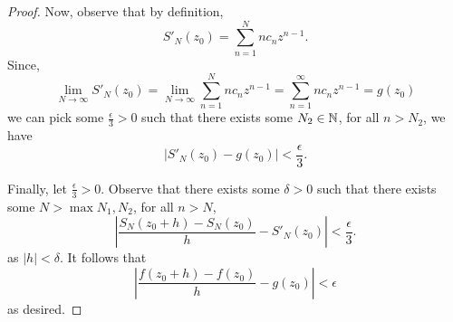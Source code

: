 \documentclass[11pt]{article}
\begin{document}
\begin{proof}
Now, observe that by definition,
\begin{equation*}
S'_N(z_0) = \sum^N_{n=1} nc_nz^{n-1}.
\end{equation*}
Since,
\begin{equation*}
\lim_{N\to\infty} S'_N(z_0)
= \lim_{N\to\infty} \sum^N_{n=1} nc_nz^{n-1}
= \sum^\infty_{n=1} nc_nz^{n-1}
= g(z_0)
\end{equation*}
we can pick some $\frac{\epsilon}{3} >0$ such that there exists some $N_2\in\mathbb{N}$,
for all $n > N_2$, we have
\begin{equation*}
|S'_N(z_0) - g(z_0)| < \frac{\epsilon}{3}.
\end{equation*}

Finally, let $\frac{\epsilon}{3} > 0$. Observe that there exists some $\delta >
0$ such that there exists some $N > \max{N_1,N_2}$, for all $n > N$,
\begin{equation*}
\left|\frac{S_N(z_0+h) - S_N(z_0)}{h} - S'_N(z_0)\right| <
\frac{\epsilon}{3}.
\end{equation*}
as $|h| < \delta$. It follows that
\begin{equation*}
\left|\frac{f(z_0+h) - f(z_0)}{h} - g(z_0)\right| < \epsilon
\end{equation*}
as desired.
\end{proof}
\end{document}
